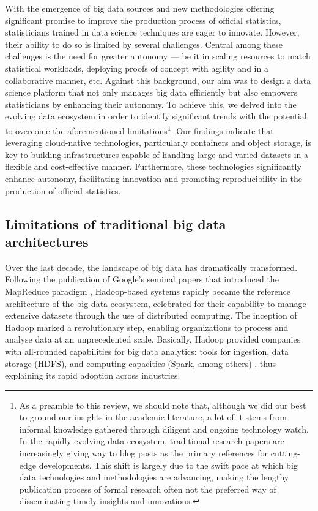 \documentclass[graybox]{svmult}
\begin{document}
With the emergence of big data sources and new methodologies offering significant promise to improve the production process of official statistics, statisticians trained in data science techniques are eager to innovate. However, their ability to do so is limited by several challenges. Central among these challenges is the need for greater autonomy — be it in scaling resources to match statistical workloads, deploying proofs of concept with agility and in a collaborative manner, etc. Against this background, our aim was to design a data science platform that not only manages big data efficiently but also empowers statisticians by enhancing their autonomy. To achieve this, we delved into the evolving data ecosystem in order to identify significant trends with the potential to overcome the aforementioned limitations\footnote{As a preamble to this review, we should note that, although we did our best to ground our insights in the academic literature, a lot of it stems from informal knowledge  gathered through diligent and ongoing technology watch. In the rapidly evolving data ecosystem, traditional research papers are increasingly giving way to blog posts as the primary references for cutting-edge developments. This shift is largely due to the swift pace at which big data technologies and methodologies are advancing, making the lengthy publication process of formal research often not the preferred way of disseminating timely insights and innovations.}. Our findings indicate that leveraging cloud-native technologies, particularly containers and object storage, is key to building infrastructures capable of handling large and varied datasets in a flexible and cost-effective manner. Furthermore, these technologies significantly enhance autonomy, facilitating innovation and promoting reproducibility in the production of official statistics.

\subsection{Limitations of traditional big data architectures}

Over the last decade, the landscape of big data has dramatically transformed. Following the publication of Google's seminal papers that introduced the MapReduce paradigm \cite{ghemawat2003google, dean2008mapreduce}, Hadoop-based systems rapidly became the reference architecture of the big data ecosystem, celebrated for their capability to manage extensive datasets through the use of distributed computing. The inception of Hadoop marked a revolutionary step, enabling organizations to process and analyse data at an unprecedented scale. Basically, Hadoop provided companies with all-rounded capabilities for big data analytics: tools for ingestion, data storage (HDFS), and computing capacities (Spark, among others) \cite{dhyani2014big}, thus explaining its rapid adoption across industries.
\end{document}
